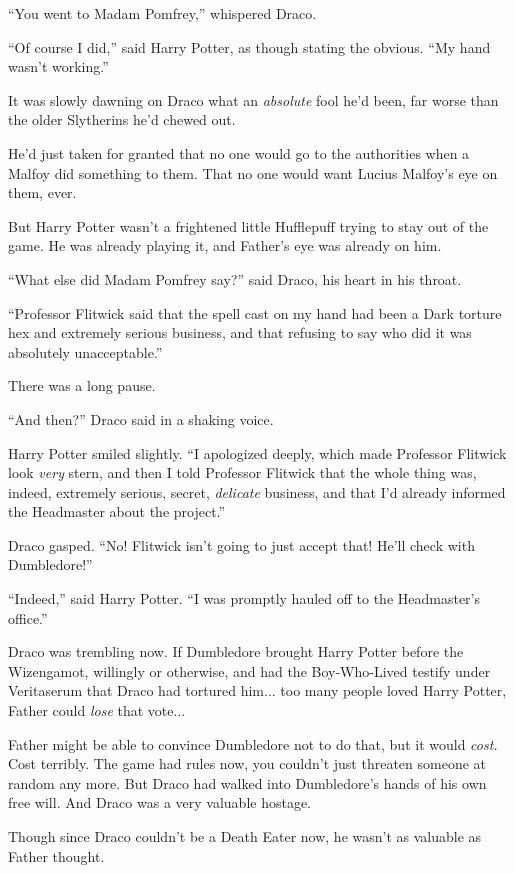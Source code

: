 ``You went to Madam Pomfrey,'' whispered Draco.

``Of course I did,'' said Harry Potter, as though stating the obvious. ``My hand wasn't working.''

It was slowly dawning on Draco what an \emph{absolute} fool he'd been, far worse than the older Slytherins he'd chewed out.

He'd just taken for granted that no one would go to the authorities when a Malfoy did something to them. That no one would want Lucius Malfoy's eye on them, ever.

But Harry Potter wasn't a frightened little Hufflepuff trying to stay out of the game. He was already playing it, and Father's eye was already on him.

``What else did Madam Pomfrey say?'' said Draco, his heart in his throat.

``Professor Flitwick said that the spell cast on my hand had been a Dark torture hex and extremely serious business, and that refusing to say who did it was absolutely unacceptable.''

There was a long pause.

``And then?'' Draco said in a shaking voice.

Harry Potter smiled slightly. ``I apologized deeply, which made Professor Flitwick look \emph{very} stern, and then I told Professor Flitwick that the whole thing was, indeed, extremely serious, secret, \emph{delicate} business, and that I'd already informed the Headmaster about the project.''

Draco gasped. ``No! Flitwick isn't going to just accept that! He'll check with Dumbledore!''

``Indeed,'' said Harry Potter. ``I was promptly hauled off to the Headmaster's office.''

Draco was trembling now. If Dumbledore brought Harry Potter before the Wizengamot, willingly or otherwise, and had the Boy-Who-Lived testify under Veritaserum that Draco had tortured him... too many people loved Harry Potter, Father could \emph{lose} that vote...

Father might be able to convince Dumbledore not to do that, but it would \emph{cost.} Cost terribly. The game had rules now, you couldn't just threaten someone at random any more. But Draco had walked into Dumbledore's hands of his own free will. And Draco was a very valuable hostage.

Though since Draco couldn't be a Death Eater now, he wasn't as valuable as Father thought.

